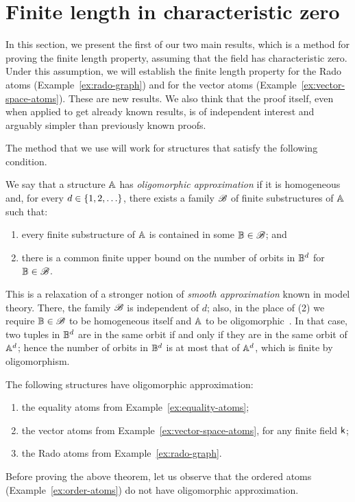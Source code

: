 \section{Finite length in characteristic zero}
\label{sec:characteristic-zero}

In this section, we present the first of our two main results, which is a  method for proving the finite length property, assuming that the field has characteristic zero. Under this assumption, we will establish the finite length property for the Rado atoms (Example~\ref{ex:rado-graph}) and for the vector atoms (Example~\ref{ex:vector-space-atoms}). These are new results. We also think that the proof itself, even when applied to get already known results, is of independent interest and arguably simpler than previously known proofs.

The method that we use will work for structures that satisfy the following condition. 
 
\begin{definition}
    \label{def:oligomorphic-approximation} We say that a structure  $\mathbb{A}$ has \emph{oligomorphic approximation} if it is homogeneous and,  for every $d \in \{1,2,\ldots\}$, there exists a family $\mathscr{B}$ of finite substructures of $\mathbb{A}$ such that: 
    \begin{enumerate}
        \item \label{item:oligomorphic-approximation-embedding} every finite substructure of $\mathbb{A}$ is contained in some $\mathbb{B} \in \mathscr{B}$; and
        \item \label{item:oligomorphic-approximation-orbits} there is a common finite upper bound on the number of orbits in $\mathbb{B}^d$ for $\mathbb{B} \in \mathscr{B}$.
    \end{enumerate}
\end{definition}

This is a relaxation of a stronger notion of  \emph{smooth approximation} known in model theory. There, the family $\mathscr{B}$ is independent of $d$; 
also, in the place of (2) we require $\mathbb{B} \in \mathscr{B}$ to be homogeneous itself and $\mathbb{A}$ to be oligomorphic~\cite[p.~440]{KLM89}. 
In that case, two tuples in $\mathbb{B}^d$ are in the same orbit if and only if they are in the same orbit of $\mathbb{A}^d$; 
hence the number of orbits in $\mathbb{B}^d$ is at most that of $\mathbb{A}^d$, which is finite by oligomorphism.

\begin{theorem}\label{thm:have-oligomorphic-approximation}
    The following structures have oligomorphic approximation: 
    \begin{enumerate}
        \item the equality atoms from Example~\ref{ex:equality-atoms};
        \item the vector atoms from Example~\ref{ex:vector-space-atoms}, for any finite field $\mathsf{k}$;
        \item \label{item:rado-has-oligomorphic-approximation} the Rado atoms from Example~\ref{ex:rado-graph}.
    \end{enumerate}
\end{theorem}
Before proving the above theorem, let us observe that the ordered atoms (Example~\ref{ex:order-atoms}) do not have oligomorphic approximation.

